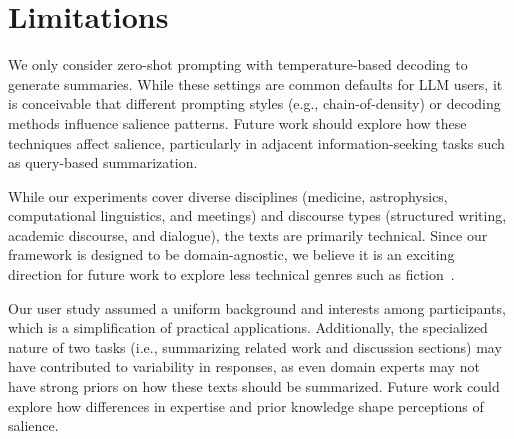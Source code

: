 \section*{Limitations}
We only consider zero-shot prompting with temperature-based decoding to generate summaries. While these settings are common defaults for LLM users, it is conceivable that different prompting styles (e.g., chain-of-density) or decoding methods influence salience patterns. Future work should explore how these techniques affect salience, particularly in adjacent information-seeking tasks such as query-based summarization.

While our experiments cover diverse disciplines (medicine, astrophysics, computational linguistics, and meetings) and discourse types (structured writing, academic discourse, and dialogue), the texts are primarily technical. Since our framework is designed to be domain-agnostic, we believe it is an exciting direction for future work to explore less technical genres such as fiction~\cite{Kim:2024:COLM}.

Our user study assumed a uniform background and interests among participants, which is a simplification of practical applications. Additionally, the specialized nature of two tasks (i.e., summarizing related work and discussion sections) may have contributed to variability in responses, as even domain experts may not have strong priors on how these texts should be summarized. Future work could explore how differences in expertise and prior knowledge shape perceptions of salience.

